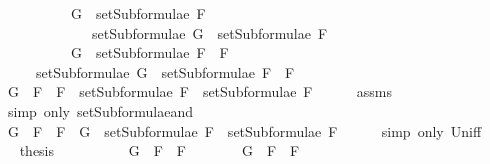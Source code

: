 \begin{isabellebody}
\ \ \ \ \ \ \ \ \ \ {\isachardoublequoteopen}G\ {\isasymin}\ setSubformulae\ F{}\ \isanewline
\ \ \ \ \ \ \ \ \ \ \ \ {\isasymLongrightarrow}\ setSubformulae\ G\ {\isasymsubseteq}\ setSubformulae\ F{}{\isachardoublequoteclose}\isanewline
\ \ \ \ \ \ \ \ \ \ {\isachardoublequoteopen}G\ {\isasymin}\ setSubformulae\ {\isacharparenleft}F{}\ \isactrlbold {\isasymand}\ F{}{\isacharparenright}{\isachardoublequoteclose}\isanewline
\ \ \ \ \ {\isachardoublequoteopen}setSubformulae\ G\ {\isasymsubseteq}\ setSubformulae\ {\isacharparenleft}F{}\ \isactrlbold {\isasymand}\ F{}{\isacharparenright}{\isachardoublequoteclose}\isanewline
%
\isadelimproof
%
\endisadelimproof
%
\isatagproof
{}\isamarkupfalse%
\ {\isacharminus}\isanewline
\ \ \isamarkupfalse%
\ {\isachardoublequoteopen}G\ {\isasymin}\ {\isacharbraceleft}F{}\ \isactrlbold {\isasymand}\ F{}{\isacharbraceright}\ {\isasymunion}\ {\isacharparenleft}setSubformulae\ F{}\ {\isasymunion}\ setSubformulae\ F{}{\isacharparenright}{\isachardoublequoteclose}\isanewline
\ \ \ \ \isamarkupfalse%
\ assms{\isacharparenleft}{}{\isacharparenright}\ \isanewline
\ \ \ \ \isamarkupfalse%
\ {\isacharparenleft}simp\ only{\isacharcolon}\ setSubformulae{\isacharunderscore}and{\isacharparenright}\isanewline
\ \ \isamarkupfalse%
\ \isamarkupfalse%
\ {\isachardoublequoteopen}G\ {\isasymin}\ {\isacharbraceleft}F{}\ \isactrlbold {\isasymand}\ F{}{\isacharbraceright}\ {\isasymor}\ G\ {\isasymin}\ setSubformulae\ F{}\ {\isasymunion}\ setSubformulae\ F{}{\isachardoublequoteclose}\isanewline
\ \ \ \ \isamarkupfalse%
\ {\isacharparenleft}simp\ only{\isacharcolon}\ Un{\isacharunderscore}iff{\isacharparenright}\isanewline
\ \ \isamarkupfalse%
\ \isamarkupfalse%
\ {\isacharquery}thesis\isanewline
\ \ \isamarkupfalse%
\ \isanewline
\ \ \ \ \isamarkupfalse%
\ {\isachardoublequoteopen}G\ {\isasymin}\ {\isacharbraceleft}F{}\ \isactrlbold {\isasymand}\ F{}{\isacharbraceright}{\isachardoublequoteclose}\isanewline
\ \ \ \ \isamarkupfalse%
\ \isamarkupfalse%
\ {\isachardoublequoteopen}G\ {\isacharequal}\ F{}\ \isactrlbold {\isasymand}\ F{}{\isachardoublequoteclose}\isanewline
\ \ \ \ \ \ \isamarkupfalse%

\end{isabellebody}

